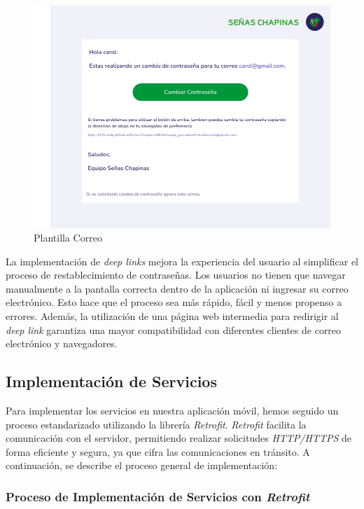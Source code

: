 \begin{itemize}
        \begin{figure} [H]
            \centering
            \includegraphics[width=0.5\linewidth]{figuras/plantilla_correo.png}
            \caption{Plantilla Correo}
            \label{fig:enter-label}
        \end{figure}
    
\end{itemize}


La implementación de \textit{deep links} mejora la experiencia del usuario al simplificar el proceso de restablecimiento de contraseñas. Los usuarios no tienen que navegar manualmente a la pantalla correcta dentro de la aplicación ni ingresar su correo electrónico. Esto hace que el proceso sea más rápido, fácil y menos propenso a errores. Además, la utilización de una página web intermedia para redirigir al \textit{deep link} garantiza una mayor compatibilidad con diferentes clientes de correo electrónico y navegadores.




\subsection{Implementación de Servicios}

Para implementar los servicios en nuestra aplicación móvil, hemos seguido un proceso estandarizado utilizando la librería \textit{Retrofit}. \textit{Retrofit} facilita la comunicación con el servidor, permitiendo realizar solicitudes \textit{HTTP/HTTPS} de forma eficiente y segura, ya que cifra las comunicaciones en tránsito. A continuación, se describe el proceso general de implementación:

\subsubsection{Proceso de Implementación de Servicios con \textit{Retrofit}}

